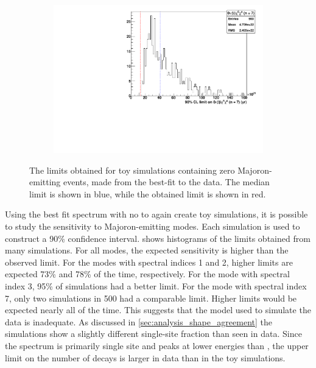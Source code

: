 \documentclass[herrin-thesis.tex]{subfiles}
\begin{document}
\begin{figure}[htp]
\begin{subfigure}[c]{0.48\textwidth}
	\end{subfigure}\hfill%
	\begin{subfigure}[c]{0.48\textwidth}
	\centering
	\includegraphics[width=\textwidth]{./plots/analysis_bb0nX7_sensitivity.pdf}
	\end{subfigure}
\caption[Sensitivity studies for \(0\nu\beta\beta\chi^0(\chi^0)\)]{The limits obtained for toy simulations containing zero Majoron-emitting events, made from the best-fit to the data. The median limit is shown in blue, while the obtained limit is shown in red.}
\label{fig:analysis_bb0nX_sensitivity}
\end{figure}

Using the best fit spectrum with no \zeronuXpX{} to again create toy simulations, it is possible to study the sensitivity to Majoron-emitting modes. Each simulation is used to construct a 90\% confidence interval.  shows histograms of the limits obtained from many simulations. For all modes, the expected sensitivity is higher than the observed limit. For the modes with spectral indices 1 and 2, higher limits are expected 73\% and 78\% of the time, respectively. For the mode with spectral index 3, 95\% of simulations had a better limit. For the mode with spectral index 7, only two simulations in 500 had a comparable limit. Higher limits would be expected nearly all of the time. This suggests that the model used to simulate the data is inadequate. As discussed in \cref{sec:analysis_shape_agreement} the simulations show a slightly different single-site fraction than seen in data. Since the \zeronuXX{} spectrum is primarily single site and peaks at lower energies than \twonu{}, the upper limit on the number of decays is larger in data than in the toy simulations.
\end{document}
